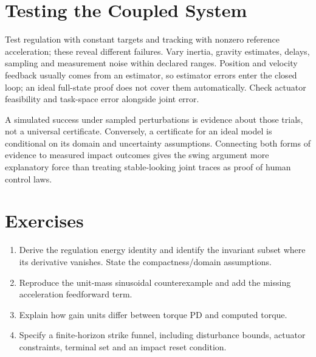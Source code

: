 \section{Testing the Coupled System}

Test regulation with constant targets and tracking with nonzero reference
acceleration; these reveal different failures. Vary inertia, gravity estimates,
delays, sampling and measurement noise within declared ranges. Position and
velocity feedback usually comes from an estimator, so estimator errors enter
the closed loop; an ideal full-state proof does not cover them automatically.
Check actuator feasibility and task-space error alongside joint error.

A simulated success under sampled perturbations is evidence about those trials,
not a universal certificate. Conversely, a certificate for an ideal model is
conditional on its domain and uncertainty assumptions. Connecting both forms of
evidence to measured impact outcomes gives the swing argument more explanatory
force than treating stable-looking joint traces as proof of human control laws.

\section*{Exercises}
\begin{enumerate}
 \item Derive the regulation energy identity and identify the invariant subset
 where its derivative vanishes. State the compactness/domain assumptions.
 \item Reproduce the unit-mass sinusoidal counterexample and add the missing
 acceleration feedforward term.
 \item Explain how gain units differ between torque PD and computed torque.
 \item Specify a finite-horizon strike funnel, including disturbance bounds,
 actuator constraints, terminal set and an impact reset condition.
\end{enumerate}
